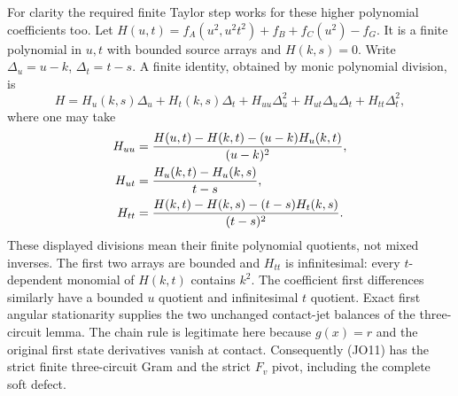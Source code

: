 For clarity the required finite Taylor step works for these higher
polynomial coefficients too. Let $H(u,t)=f_A(u^2,u^2t^2)+f_B+
f_C(u^2)-f_G$. It is a finite polynomial in $u,t$ with bounded
source arrays and $H(k,s)=0$. Write $\Delta_u=u-k$,
$\Delta_t=t-s$. A finite identity, obtained by monic polynomial
division, is
\[
 H=H_u(k,s)\Delta_u+H_t(k,s)\Delta_t+
       H_{uu}\Delta_u^2+H_{ut}\Delta_u\Delta_t+
       H_{tt}\Delta_t^2,                              \tag{JO13}
\]
where one may take
\[
 \begin{aligned}
 H_{uu}&={H(u,t)-H(k,t)-(u-k)H_u(k,t)\over(u-k)^2},\\
 H_{ut}&={H_u(k,t)-H_u(k,s)\over t-s},\\
 H_{tt}&={H(k,t)-H(k,s)-(t-s)H_t(k,s)\over(t-s)^2}.
 \end{aligned}
\]
These displayed divisions mean their finite polynomial quotients,
not mixed inverses. The first two arrays are bounded and $H_{tt}$
is infinitesimal: every $t$-dependent monomial of $H(k,t)$
contains $k^2$. The coefficient first differences similarly have a
bounded $u$ quotient and infinitesimal $t$ quotient. Exact first
angular stationarity supplies the two unchanged contact-jet balances
of the three-circuit lemma. The chain rule is legitimate here because
$g(x)=r$ and the original first state derivatives vanish at contact.
Consequently (JO11) has the strict finite three-circuit Gram and the
strict $F_v$ pivot, including the complete soft defect.

